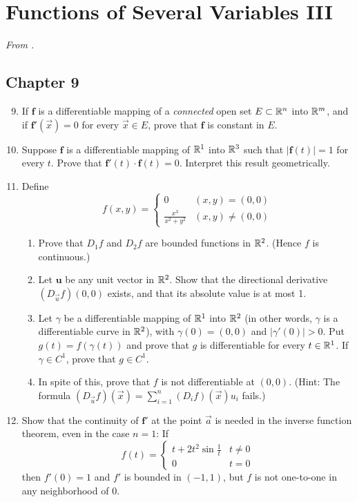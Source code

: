\documentclass[../psets.tex]{subfiles}
\begin{document}
\section{Functions of Several Variables III}
\emph{From \textcite{bib:Rudin}.}
\subsection*{Chapter 9}
\begin{enumerate}[label={\textbf{\arabic*.}}]
    \setcounter{enumi}{8}
    \item {}If $\mathbf{f}$ is a differentiable mapping of a \emph{connected} open set $E\subset\mathbb{R}^n$ into $\mathbb{R}^m$, and if $\mathbf{f}'(\vec{x})=0$ for every $\vec{x}\in E$, prove that $\mathbf{f}$ is constant in $E$.
    \setcounter{enumi}{12}
    \item Suppose $\mathbf{f}$ is a differentiable mapping of $\mathbb{R}^1$ into $\mathbb{R}^3$ such that $|\mathbf{f}(t)|=1$ for every $t$. Prove that $\mathbf{f}'(t)\cdot\mathbf{f}(t)=0$. Interpret this result geometrically.
    \item Define
    \begin{equation*}
        f(x,y) =
        \begin{cases}
            0 & (x,y)=(0,0)\\
            \frac{x^3}{x^2+y^2} & (x,y)\neq(0,0)
        \end{cases}
    \end{equation*}
    \begin{enumerate}
        \item Prove that $D_1f$ and $D_2f$ are bounded functions in $\mathbb{R}^2$. (Hence $f$ is continuous.)
        \item Let $\mathbf{u}$ be any unit vector in $\mathbb{R}^2$. Show that the directional derivative $(D_\vec{u}f)(0,0)$ exists, and that its absolute value is at most 1.
        \item Let $\gamma$ be a differentiable mapping of $\mathbb{R}^1$ into $\mathbb{R}^2$ (in other words, $\gamma$ is a differentiable curve in $\mathbb{R}^2$), with $\gamma(0)=(0,0)$ and $|\gamma'(0)|>0$. Put $g(t)=f(\gamma(t))$ and prove that $g$ is differentiable for every $t\in\mathbb{R}^1$. If $\gamma\in C^1$, prove that $g\in C^1$.
        \item In spite of this, prove that $f$ is not differentiable at $(0,0)$. (Hint: The formula $(D_\vec{u}f)(\vec{x})=\sum_{i=1}^n(D_if)(\vec{x})u_i$ fails.)
    \end{enumerate}
    \item Show that the continuity of $\mathbf{f}'$ at the point $\vec{a}$ is needed in the inverse function theorem, even in the case $n=1$: If
    \begin{equation*}
        f(t) =
        \begin{cases}
            t+2t^2\sin\frac{1}{t} & t\neq 0\\
            0 & t=0
        \end{cases}
    \end{equation*}
    then $f'(0)=1$ and $f'$ is bounded in $(-1,1)$, but $f$ is not one-to-one in any neighborhood of 0.
\end{enumerate}
\end{document}
